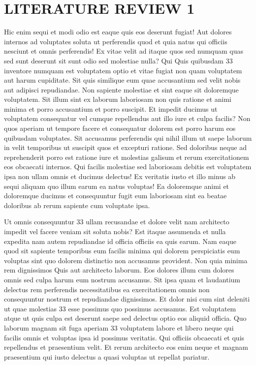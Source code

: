\documentclass[a4paper,12pt]{report}
\begin{document}
\section{LITERATURE REVIEW 1}
\hspace{.5cm}Hic enim sequi et modi odio est eaque quis eos deserunt fugiat! Aut dolores internos ad voluptates soluta ut perferendis quod et quia natus qui officiis nesciunt et omnis perferendis! Ex vitae velit ad itaque quos sed numquam quas sed sunt deserunt sit sunt odio sed molestiae nulla? Qui Quis quibusdam 33 inventore numquam est voluptatem optio et vitae fugiat non quam voluptatem aut harum cupiditate. Sit quis similique eum quae accusantium sed velit nobis aut adipisci repudiandae. Non sapiente molestiae et sint eaque sit doloremque voluptatem. Sit illum sint ex laborum laboriosam non quis ratione et animi minima et porro accusantium et porro suscipit. Et impedit ducimus ut voluptatem consequatur vel cumque repellendus aut illo iure et culpa facilis? Non quos aperiam ut tempore facere et consequatur dolorem est porro harum eos quibusdam voluptates. Sit accusamus perferendis qui nihil illum ut saepe laborum in velit temporibus ut suscipit quos et excepturi ratione. Sed doloribus neque ad reprehenderit porro est ratione iure et molestias galisum et rerum exercitationem eos obcaecati internos. Qui facilis molestiae sed laboriosam debitis est voluptatem ipsa non ullam omnis et ducimus delectus! Ex veritatis iusto et illo minus ab sequi aliquam quo illum earum ea natus voluptas! Ea doloremque animi et doloremque ducimus et consequuntur fugit eum laboriosam sint ea beatae doloribus ab rerum sapiente cum voluptate ipsa. 
\par Ut omnis consequuntur 33 ullam recusandae et dolore velit nam architecto impedit vel facere veniam sit soluta nobis? Est itaque assumenda et nulla expedita nam autem repudiandae id officia officiis ea quis earum. Nam eaque quod sit sapiente temporibus eum facilis minima qui dolorem perspiciatis eum voluptas sint quo dolorem distinctio non accusamus provident. Non quia minima rem dignissimos Quis aut architecto laborum. Eos dolores illum cum dolores omnis sed culpa harum eum nostrum accusamus. Sit ipsa quam et laudantium delectus rem perferendis necessitatibus ea exercitationem omnis non consequuntur nostrum et repudiandae dignissimos. Et dolor nisi cum sint deleniti ut quae molestias 33 esse possimus quo possimus accusamus. Est voluptatem atque ut quis culpa est deserunt saepe sed delectus optio eos aliquid officia. Quo laborum magnam sit fuga aperiam 33 voluptatem labore et libero neque qui facilis omnis et voluptas ipsa id possimus veritatis. Qui officiis obcaecati et quis repellendus et praesentium velit. Et rerum architecto eos enim neque et magnam praesentium qui iusto delectus a quasi voluptas ut repellat pariatur. 
\end{document}
